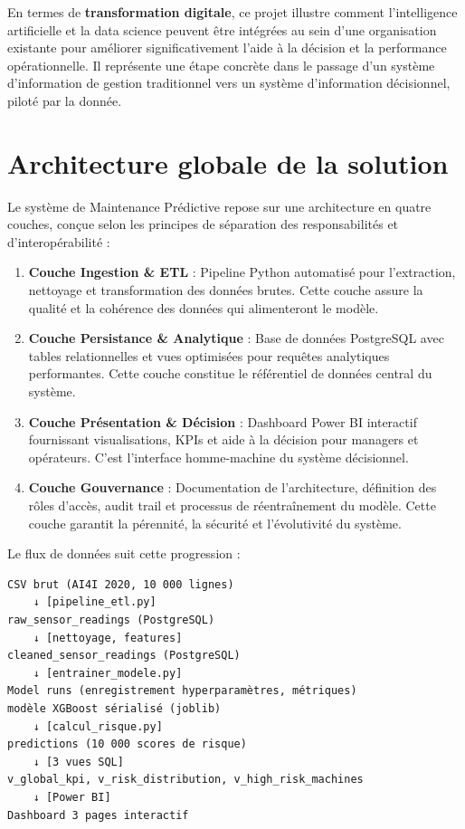 \documentclass[a4paper,12pt]{report}
\begin{document}
En termes de \textbf{transformation digitale}, ce projet illustre comment l'intelligence artificielle et la data science peuvent être intégrées au sein d'une organisation existante pour améliorer significativement l'aide à la décision et la performance opérationnelle. Il représente une étape concrète dans le passage d'un système d'information de gestion traditionnel vers un système d'information décisionnel, piloté par la donnée.

\section{Architecture globale de la solution}

Le système de Maintenance Prédictive repose sur une architecture en quatre couches, conçue selon les principes de séparation des responsabilités et d'interopérabilité :

\begin{enumerate}
    \item \textbf{Couche Ingestion \& ETL} : Pipeline Python automatisé pour l'extraction, nettoyage et transformation des données brutes. Cette couche assure la qualité et la cohérence des données qui alimenteront le modèle.
    \item \textbf{Couche Persistance \& Analytique} : Base de données PostgreSQL avec tables relationnelles et vues optimisées pour requêtes analytiques performantes. Cette couche constitue le référentiel de données central du système.
    \item \textbf{Couche Présentation \& Décision} : Dashboard Power BI interactif fournissant visualisations, KPIs et aide à la décision pour managers et opérateurs. C'est l'interface homme-machine du système décisionnel.
    \item \textbf{Couche Gouvernance} : Documentation de l'architecture, définition des rôles d'accès, audit trail et processus de réentraînement du modèle. Cette couche garantit la pérennité, la sécurité et l'évolutivité du système.
\end{enumerate}

Le flux de données suit cette progression :

\begin{verbatim}
CSV brut (AI4I 2020, 10 000 lignes)
    ↓ [pipeline_etl.py]
raw_sensor_readings (PostgreSQL)
    ↓ [nettoyage, features]
cleaned_sensor_readings (PostgreSQL)
    ↓ [entrainer_modele.py]
Model runs (enregistrement hyperparamètres, métriques)
modèle XGBoost sérialisé (joblib)
    ↓ [calcul_risque.py]
predictions (10 000 scores de risque)
    ↓ [3 vues SQL]
v_global_kpi, v_risk_distribution, v_high_risk_machines
    ↓ [Power BI]
Dashboard 3 pages interactif
\end{verbatim}
\end{document}

